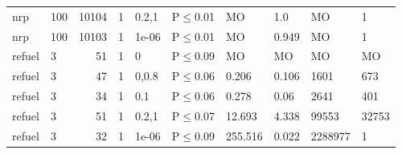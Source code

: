 \begin{longtable}{llrrllllll}
 nrp           & 100      &  	10104 & 1 & 0.2,1 & P$\leq$0.01  & MO       & 1.0      & MO      & 1      \\
 nrp           & 100      &  	10103 & 1 & 1e-06 & P$\leq$0.01  & MO       & 0.949    & MO      & 1      \\
 refuel        & 3        &     	51 & 1 & 0     & P$\leq$0.09  & MO       & MO       & MO      & MO     \\
 refuel        & 3        &     	47 & 1 & 0,0.8 & P$\leq$0.06  & 0.206    & 0.106    & 1601    & 673    \\
 refuel        & 3        &     	34 & 1 & 0.1   & P$\leq$0.06  & 0.278    & 0.06     & 2641    & 401    \\
 refuel        & 3        &     	51 & 1 & 0.2,1 & P$\leq$0.07  & 12.693   & 4.338    & 99553   & 32753  \\
 refuel        & 3        &     	32 & 1 & 1e-06 & P$\leq$0.09  & 255.516  & 0.022    & 2288977 & 1      \\
\bottomrule
\end{longtable}

